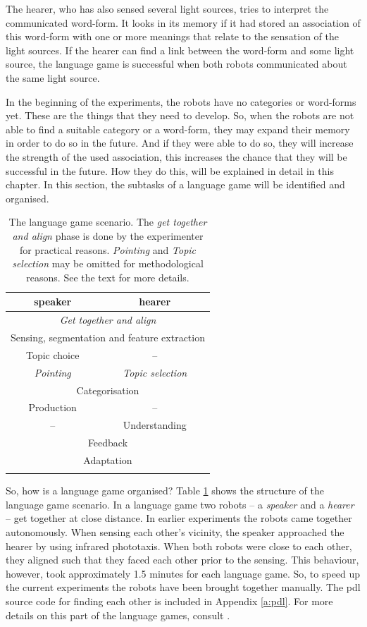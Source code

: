 The hearer, who has also sensed several light sources, tries to interpret the communicated word-form. It looks in its memory if it had stored an association of this word-form with one or more meanings that relate to the sensation of the light sources. If the hearer can find a link between the word-form and some light source, the language game is successful when both robots communicated about the same light source.

In the beginning of the experiments, the robots have no categories or word-forms yet. These are the things that they need to develop. So, when the robots are not able to find a suitable category or a word-form, they may expand their memory in order to do so in the future. And if they were able to do so, they will increase the strength of the used association, this increases the chance that they will be successful in the future. How they do this, will be explained in detail in this chapter. In this section, the subtasks of a language game will be identified and organised.

\begin{table}
\centering
\begin{tabular}{cc}
\lsptoprule
{\sc speaker} & {\sc hearer}\\
\midrule
\multicolumn{2}{c}{{\em Get together and align}}\\\hline
\multicolumn{2}{c}{Sensing, segmentation and feature extraction}\\\hline
Topic choice & --\\\hline
{\em Pointing} & {\em Topic selection}\\\hline
\multicolumn{2}{c}{Categorisation}\\\hline
Production & --\\\hline
-- & Understanding\\\hline
\multicolumn{2}{c}{Feedback}\\\hline
\multicolumn{2}{c}{Adaptation}\\\lspbottomrule
\end{tabular}
\caption{The language game scenario. The {\it get together and align} phase is done by the experimenter for practical reasons. {\em Pointing} and {\em Topic selection} may be omitted for methodological reasons. See the text for more details.}
\label{t:scenario1}
\end{table}


So, how is a language game organised? Table \ref{t:scenario1} shows the structure of the language game scenario. In a language game two robots -- a {\em speaker} and a {\em hearer} -- get together at close distance. In earlier experiments \citep{steelsvogt:1997} the robots came together autonomously. When sensing each other's vicinity, the speaker approached the hearer by using infrared phototaxis. When both robots were close to each other, they aligned such that they faced each other prior to the sensing. This behaviour, however, took approximately 1.5 minutes for each language game. So, to speed up the current experiments the robots have been brought together manually. The {\sc pdl} source code for finding each other is included in Appendix \ref{a:pdl}. For more details on this part of the language games, consult \citep{vogt:1997}.  

